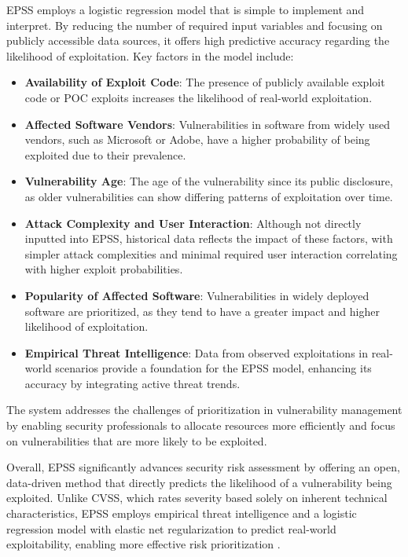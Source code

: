 \ac{EPSS} employs a logistic regression model that is simple to implement and interpret. By reducing the number of required input variables and focusing on publicly accessible data sources, it offers high predictive accuracy regarding the likelihood of exploitation. Key factors in the model include:

\begin{itemize}
    \item \textbf{Availability of Exploit Code}: The presence of publicly available exploit code or \ac{POC} exploits increases the likelihood of real-world exploitation.
    \item \textbf{Affected Software Vendors}: Vulnerabilities in software from widely used vendors, such as Microsoft or Adobe, have a higher probability of being exploited due to their prevalence.
    \item \textbf{Vulnerability Age}: The age of the vulnerability since its public disclosure, as older vulnerabilities can show differing patterns of exploitation over time.
    \item \textbf{Attack Complexity and User Interaction}: Although not directly inputted into \ac{EPSS}, historical data reflects the impact of these factors, with simpler attack complexities and minimal required user interaction correlating with higher exploit probabilities.
    \item \textbf{Popularity of Affected Software}: Vulnerabilities in widely deployed software are prioritized, as they tend to have a greater impact and higher likelihood of exploitation.
    \item \textbf{Empirical Threat Intelligence}: Data from observed exploitations in real-world scenarios provide a foundation for the \ac{EPSS} model, enhancing its accuracy by integrating active threat trends.
\end{itemize}

The system addresses the challenges of prioritization in vulnerability management by enabling security professionals to allocate resources more efficiently and focus on vulnerabilities that are more likely to be exploited.

Overall, \ac{EPSS} significantly advances security risk assessment by offering an open, data-driven method that directly predicts the likelihood of a vulnerability being exploited. Unlike \ac{CVSS}, which rates severity based solely on inherent technical characteristics, \ac{EPSS} employs empirical threat intelligence and a logistic regression model with elastic net regularization to predict real-world exploitability, enabling more effective risk prioritization \autocite{jacobs_exploit_2021}.

